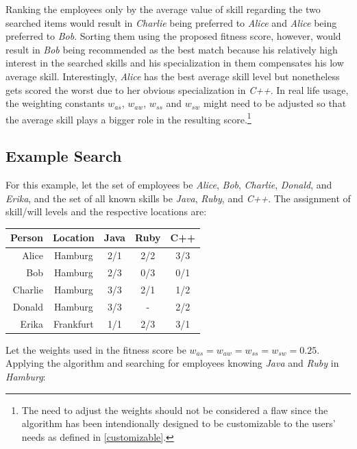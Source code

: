 Ranking the employees only by the average value of skill regarding the two searched items would result in \textit{Charlie} being preferred to \textit{Alice} and \textit{Alice} being preferred to \textit{Bob}. Sorting them using the proposed fitness score, however, would result in \textit{Bob} being recommended as the best match because his relatively high interest in the searched skills and his specialization in them compensates his low average skill. Interestingly, \textit{Alice} has the best average skill level but nonetheless gets scored the worst due to her obvious specialization in \textit{C++}. In real life usage, the weighting constants $w_{as}$, $w_{aw}$, $w_{ss}$ and $ w_{sw}$ might need to be adjusted so that the average skill plays a bigger role in the resulting score.\footnote{The need to adjust the weights should not be considered a flaw since the algorithm has been intendionally designed to be customizable to the users' needs as defined in \ref{customizable}.}

\newpage
\subsection{Example Search}
For this example, let the set of employees be \textit{Alice}, \textit{Bob}, \textit{Charlie}, \textit{Donald}, and \textit{Erika}, and the set of all known skills be \textit{Java}, \textit{Ruby}, and \textit{C++}.
The assignment of skill/will levels and the respective locations are:
\newline
\begin{center}
\begin{tabular}{r|c|ccc}
  Person  & Location & Java & Ruby & C++ \\
  \hline
  Alice   & Hamburg   & 2/1 & 2/2 & 3/3 \\
  Bob     & Hamburg   & 2/3 & 0/3 & 0/1 \\
  Charlie & Hamburg   & 3/3 & 2/1 & 1/2 \\
  Donald  & Hamburg   & 3/3 &  -  & 2/2 \\
  Erika   & Frankfurt & 1/1 & 2/3 & 3/1 \\
\end{tabular}
\end{center}

Let the weights used in the fitness score be $w_{as} = w_{aw} = w_{ss} = w_{sw} = 0.25$.
Applying the algorithm and searching for employees knowing \textit{Java} and \textit{Ruby} in \textit{Hamburg}:\\


